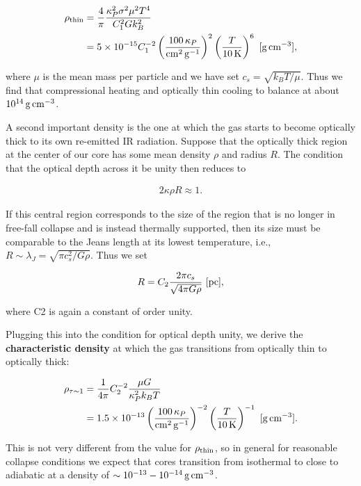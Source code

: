 \documentclass[a4paper,10pt]{article}
\begin{document}
\begin{align*}
    \rho_{\rm thin} &= \frac{4}{\pi} \frac{\kappa_P^2\sigma^2\mu^2T^4}{C_1^2Gk_B^2} \\
    &= 5\times10^{-15} C_1^{-2} \left(\frac{100\,\kappa_P}{{\rm cm^2\,g^{-1}}}\right)^2 \left(\frac{T}{10\,{\rm K}}\right)^6 ~ [{\rm g\,cm^{-3}}],
\end{align*}

{\noindent}where $\mu$ is the mean mass per particle and we have set $c_s=\sqrt{k_BT/\mu}$. Thus we find that compressional heating and optically thin cooling to balance at about $10^{14}\,{\rm g\,cm^{-3}}$.

{\noindent}A second important density is the one at which the gas starts to become optically thick to its own re-emitted IR radiation. Suppose that the optically thick region at the center of our core has some mean density $\rho$ and radius $R$. The condition that the optical depth across it be unity then reduces to

\begin{align*}
    2\kappa\rho R \approx 1.
\end{align*}

{\noindent}If this central region corresponds to the size of the region that is no longer in free-fall collapse and is instead thermally supported, then its size must be comparable to the Jeans length at its lowest temperature, i.e., $R\sim\lambda_J = \sqrt{\pi c_s^2/G\rho}$. Thus we set

\begin{align*}
    R = C_2 \frac{2\pi c_s}{\sqrt{4\pi G\rho}} ~ [{\rm pc}],
\end{align*}

{\noindent}where C2 is again a constant of order unity.

{\noindent}Plugging this into the condition for optical depth unity, we derive the \textbf{characteristic density} at which the gas transitions from optically thin to optically thick:

\begin{align*}
    \rho_{\tau\sim1} &= \frac{1}{4\pi} C_2^{-2} \frac{\mu G}{\kappa_P^2k_BT} \\
    &= 1.5\times10^{-13} \left(\frac{100\,\kappa_P}{{\rm cm^2\,g^{-1}}}\right)^{-2} \left(\frac{T}{10\,{\rm K}}\right)^{-1} ~ [{\rm g\,cm^{-3}}].
\end{align*}

{\noindent}This is not very different from the value for $\rho_{\rm thin}$, so in general for reasonable collapse conditions we expect that cores transition from isothermal to close to adiabatic at a density of $\sim10^{-13}-10^{-14}\,{\rm g\,cm^{-3}}$.
\end{document}
